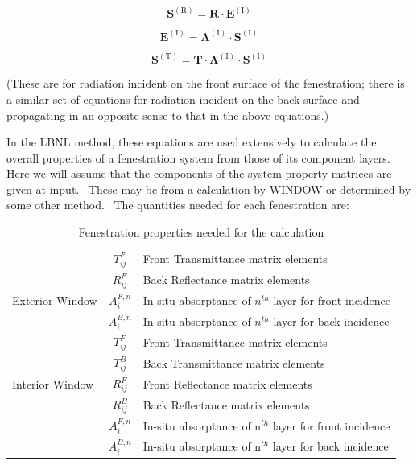 \begin{equation}
{{\mathbf{S}}^{{\mathrm{(R)}}}} = {\mathbf{R}} \cdot {{\mathbf{E}}^{{\mathrm{(I)}}}}
\end{equation}

\begin{equation}
{{\mathbf{E}}^{{\mathrm{(I)}}}}{\mathbf{ = }}{\boldsymbol{\Lambda}^{{\mathrm{(I)}}}} \cdot {{\mathbf{S}}^{{\mathrm{(I)}}}}
\end{equation}

\begin{equation}
{{\mathbf{S}}^{{\mathrm{(T)}}}}{\mathbf{ = T}} \cdot {\boldsymbol{\Lambda}^{{\mathrm{(I)}}}} \cdot {{\mathbf{S}}^{{\mathrm{(I)}}}}
\end{equation}

(These are for radiation incident on the front surface of the fenestration; there is a similar set of equations for radiation incident on the back surface and propagating in an opposite sense to that in the above equations.)

In the LBNL method, these equations are used extensively to calculate the overall properties of a fenestration system from those of its component layers.~ Here we will assume that the components of the system property matrices are given at input.~ These may be from a calculation by WINDOW or determined by some other method.~ The quantities needed for each fenestration are:

\begin{table}
\caption{Fenestration properties needed for the calculation}
\centering
\begin{tabular} { | l | c | l | }
\hline
 & $T_{ij}^F$ & Front Transmittance matrix elements \\
 & $R_{ij}^F$ & Back Reflectance matrix elements \\
Exterior Window & $A_i^{F,n}$ & In-situ absorptance of $n^{th}$ layer for front incidence \\
 & $A_i^{B,n}$ & In-situ absorptance of $n^{th}$ layer for back incidence \\
\hline
 & $T_{ij}^F$ & Front Transmittance matrix elements \\
 & $T_{ij}^B$ & Back Transmittance matrix elements \\
Interior Window & $R_{ij}^F$ & Front Reflectance matrix elements \\
 & $R_{ij}^B$ & Back Reflectance matrix elements \\
 & $A_i^{F,n}$ & In-situ absorptance of n\(^{th}\) layer for front incidence \\
 & $A_i^{B,n}$ & In-situ absorptance of n\(^{th}\) layer for back incidence \\
\hline
\end{tabular}
\end{table}

